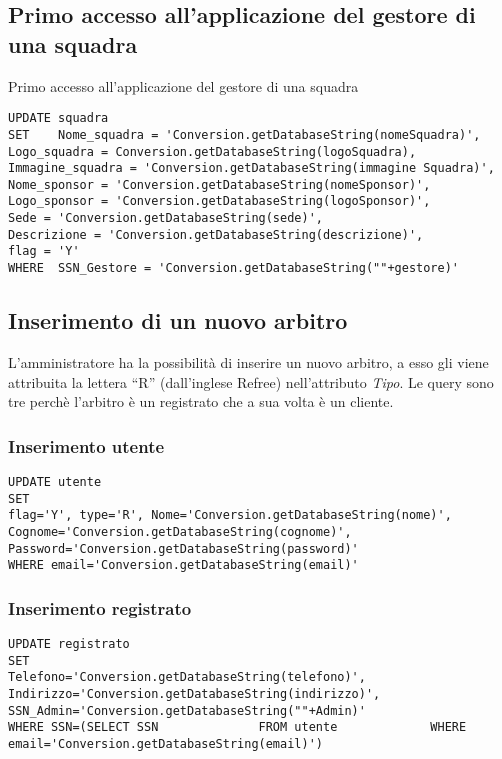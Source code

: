 \subsection*{Primo accesso all'applicazione del gestore di una squadra}
Primo accesso all'applicazione del gestore di una squadra

\begin{lstlisting}
UPDATE squadra
SET    Nome_squadra = 'Conversion.getDatabaseString(nomeSquadra)',
Logo_squadra = Conversion.getDatabaseString(logoSquadra),
Immagine_squadra = 'Conversion.getDatabaseString(immagine Squadra)',
Nome_sponsor = 'Conversion.getDatabaseString(nomeSponsor)',
Logo_sponsor = 'Conversion.getDatabaseString(logoSponsor)',
Sede = 'Conversion.getDatabaseString(sede)',
Descrizione = 'Conversion.getDatabaseString(descrizione)',
flag = 'Y'
WHERE  SSN_Gestore = 'Conversion.getDatabaseString(""+gestore)'
\end{lstlisting}

\subsection*{Inserimento di un nuovo arbitro}
L'amministratore ha la possibilità di inserire un nuovo arbitro, a esso gli viene attribuita la lettera ``R'' (dall'inglese Refree) nell'attributo \emph{Tipo}. Le query sono tre perchè l'arbitro è un registrato che a sua volta è un cliente.

\subsubsection*{Inserimento utente}

\begin{lstlisting}
UPDATE utente
SET 
flag='Y', type='R', Nome='Conversion.getDatabaseString(nome)', Cognome='Conversion.getDatabaseString(cognome)',
Password='Conversion.getDatabaseString(password)'
WHERE email='Conversion.getDatabaseString(email)'
\end{lstlisting}

\subsubsection*{Inserimento registrato}

\begin{lstlisting}
UPDATE registrato
SET 
Telefono='Conversion.getDatabaseString(telefono)', Indirizzo='Conversion.getDatabaseString(indirizzo)',
SSN_Admin='Conversion.getDatabaseString(""+Admin)'
WHERE SSN=(SELECT SSN              FROM utente             WHERE email='Conversion.getDatabaseString(email)')
\end{lstlisting}

